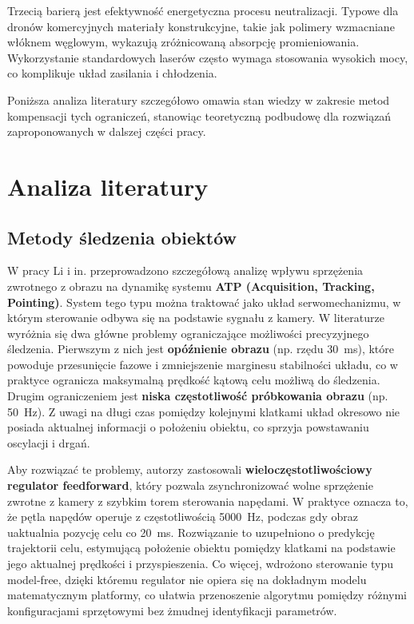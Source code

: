\documentclass[a4paper,twoside,12pt]{book}
\begin{document}
Trzecią barierą jest efektywność energetyczna procesu neutralizacji. Typowe dla dronów komercyjnych materiały konstrukcyjne, takie jak polimery wzmacniane włóknem węglowym, wykazują zróżnicowaną absorpcję promieniowania. Wykorzystanie standardowych laserów często wymaga stosowania wysokich mocy, co komplikuje układ zasilania i chłodzenia. 

Poniższa analiza literatury szczegółowo omawia stan wiedzy w zakresie metod kompensacji tych ograniczeń, stanowiąc teoretyczną podbudowę dla rozwiązań zaproponowanych w dalszej części pracy.

\section{Analiza literatury}

\subsection{Metody śledzenia obiektów}

W pracy Li i in. \cite{bib:Li2025} przeprowadzono szczegółową analizę wpływu sprzężenia zwrotnego z obrazu na dynamikę systemu \textbf{ATP (Acquisition, Tracking, Pointing)}. System tego typu można traktować jako układ serwomechanizmu, w którym sterowanie odbywa się na podstawie sygnału z kamery. W literaturze wyróżnia się dwa główne problemy ograniczające możliwości precyzyjnego śledzenia. Pierwszym z nich jest \textbf{opóźnienie obrazu} (np. rzędu 30~ms), które powoduje przesunięcie fazowe i zmniejszenie marginesu stabilności układu, co w praktyce ogranicza maksymalną prędkość kątową celu możliwą do śledzenia. Drugim ograniczeniem jest \textbf{niska częstotliwość próbkowania obrazu} (np. 50~Hz). Z uwagi na długi czas pomiędzy kolejnymi klatkami układ okresowo nie posiada aktualnej informacji o położeniu obiektu, co sprzyja powstawaniu oscylacji i drgań.

Aby rozwiązać te problemy, autorzy zastosowali \textbf{wieloczęstotliwościowy regulator feedforward}, który pozwala zsynchronizować wolne sprzężenie zwrotne z kamery z szybkim torem sterowania napędami. W praktyce oznacza to, że pętla napędów operuje z częstotliwością 5000~Hz, podczas gdy obraz uaktualnia pozycję celu co 20~ms. Rozwiązanie to uzupełniono o predykcję trajektorii celu, estymującą położenie obiektu pomiędzy klatkami na podstawie jego aktualnej prędkości i przyspieszenia. Co więcej, wdrożono sterowanie typu model-free, dzięki któremu regulator nie opiera się na dokładnym modelu matematycznym platformy, co ułatwia przenoszenie algorytmu pomiędzy różnymi konfiguracjami sprzętowymi bez żmudnej identyfikacji parametrów.
\end{document}
